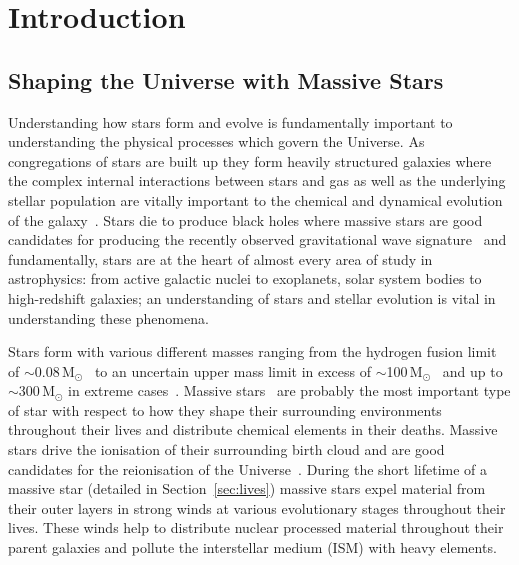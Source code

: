 \chapter{Introduction}\label{ch:intro}

\section{Shaping the Universe with Massive Stars} %
\label{sec:massive_stars}
Understanding how stars form and evolve is fundamentally important to understanding the physical processes which govern the Universe.
As congregations of stars are built up they form heavily structured galaxies where the complex internal interactions between stars and gas as well as the underlying stellar population are vitally important to the chemical and dynamical evolution of the galaxy~\citep[e.g.][]{2014ARA&A..52..291C}.
Stars die to produce black holes where massive stars are good candidates for producing the recently observed gravitational wave signature~\citep{2016PhRvL.116f1102A,2016arXiv160204735L,2016arXiv160300511W} and fundamentally, stars are at the heart of almost every area of study in astrophysics: from active galactic nuclei to exoplanets, solar system bodies to high-redshift galaxies; an understanding of stars and stellar evolution is vital in understanding these phenomena.

Stars form with various different masses ranging from the hydrogen fusion limit of $\sim$0.08\,M$_{\odot}$~\citep{1997ApJ...491..856B,2000ARA&A..38..337C} to an uncertain upper mass limit in excess of $\sim$100\,M$_{\odot}$~\citep[e.g.][]{2005Natur.434..192F,2012MNRAS.422..794E,2014A&A...568L..13W} and up to $\sim$300\,M$_{\odot}$ in extreme cases~\citep{2010MNRAS.408..731C}.
Massive stars~\citep[defined here as stars with initial masses $>$8\,M$_{\odot}$ e.g.][and expanded upon in Section~\ref{sec:lives}]{2014ARA&A..52..487S} are probably the most important type of star with respect to how they shape their surrounding environments throughout their lives and distribute chemical elements in their deaths.
Massive stars drive the ionisation of their surrounding birth cloud and are good candidates for the reionisation of the Universe~\citep[e.g.][]{1997ApJ...483...21H,2005SSRv..116..625C,2006ARA&A..44..415F}.
During the short lifetime of a massive star (detailed in Section~\ref{sec:lives}) massive stars expel material from their outer layers in strong winds at various evolutionary stages throughout their lives.
These winds help to distribute nuclear processed material throughout their parent galaxies and pollute the interstellar medium (ISM) with heavy elements.

